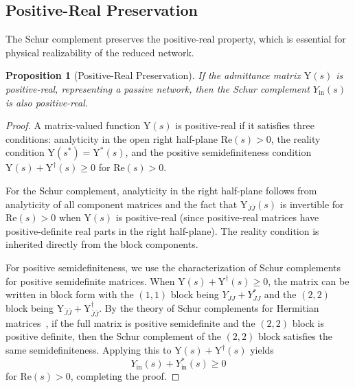\documentclass[reprint, floatfix, superscriptaddress, amsmath, amssymb, longbibliography]{revtex4-2}
\newtheorem{proposition}[theorem]{Proposition}
\begin{document}
\subsection{Positive-Real Preservation}
\label{sec:pr_preservation}

The Schur complement preserves the positive-real property, which is essential for physical realizability of the reduced network.

\begin{proposition}[Positive-Real Preservation]
\label{prop:pr_preservation}
If the admittance matrix $\mathrm{Y}(s)$ is positive-real, representing a passive network, then the Schur complement $Y_{\mathrm{in}}(s)$ is also positive-real.
\end{proposition}

\begin{proof}
A matrix-valued function $\mathrm{Y}(s)$ is positive-real if it satisfies three conditions: analyticity in the open right half-plane $\mathrm{Re}(s) > 0$, the reality condition $\mathrm{Y}(s^*) = \mathrm{Y}^*(s)$, and the positive semidefiniteness condition $\mathrm{Y}(s) + \mathrm{Y}^\dagger(s) \geq 0$ for $\mathrm{Re}(s) > 0$.

For the Schur complement, analyticity in the right half-plane follows from analyticity of all component matrices and the fact that $\mathrm{Y}_{\bar{J}\bar{J}}(s)$ is invertible for $\mathrm{Re}(s) > 0$ when $\mathrm{Y}(s)$ is positive-real (since positive-real matrices have positive-definite real parts in the right half-plane). The reality condition is inherited directly from the block components.

For positive semidefiniteness, we use the characterization of Schur complements for positive semidefinite matrices. When $\mathrm{Y}(s) + \mathrm{Y}^\dagger(s) \geq 0$, the matrix can be written in block form with the $(1,1)$ block being $Y_{JJ} + Y_{JJ}^*$ and the $(2,2)$ block being $\mathrm{Y}_{\bar{J}\bar{J}} + \mathrm{Y}_{\bar{J}\bar{J}}^\dagger$. By the theory of Schur complements for Hermitian matrices~\cite{Zhang2005}, if the full matrix is positive semidefinite and the $(2,2)$ block is positive definite, then the Schur complement of the $(2,2)$ block satisfies the same semidefiniteness. Applying this to $\mathrm{Y}(s) + \mathrm{Y}^\dagger(s)$ yields
\begin{equation}
Y_{\mathrm{in}}(s) + Y_{\mathrm{in}}^*(s) \geq 0
\end{equation}
for $\mathrm{Re}(s) > 0$, completing the proof.
\end{proof}
\end{document}
